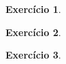 \documentclass[letter,11pt]{article}
\newtheorem{exer}{Exercício}
\begin{document}
\begin{exer} \rm %
\end{exer}


\begin{exer} \rm %
\end{exer}


\begin{exer} \rm %
\end{exer}

% 
% 
% 
% 
% 
% 
\end{document}
